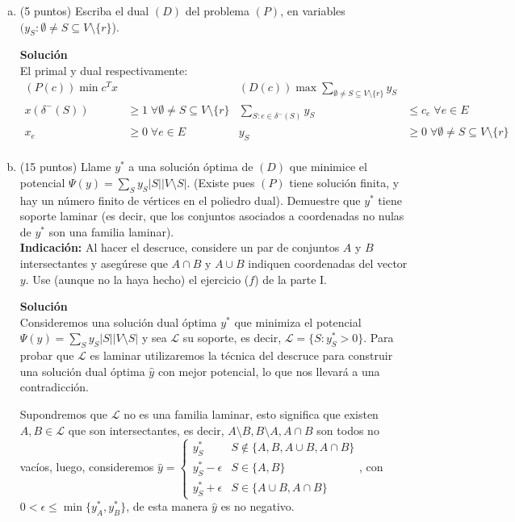 \documentclass{article}
\theoremstyle{plain}
\theoremstyle{definition}
\theoremstyle{Azul}
\begin{document}
\begin{enumerate}[(a)]
\item (5 puntos) Escriba el dual $(D)$ del problema $(P)$, en variables $(y_S\colon \emptyset \neq S \subseteq V\setminus \{r\}$).

\textbf{Solución}\\
El primal y dual respectivamente:
\begin{align*}
	(P(c)) \min c^{T}x && (D(c)) \max \sum_{\emptyset \neq S\subseteq V\setminus\{r\}}y_{S}\\
	x(\delta^{-}(S))&\geq 1 \;\forall \emptyset \neq S\subseteq V\setminus\{r\} &   \sum_{S: e\in\delta^{-}(S)}y_{S}&\leq c_{e} \; \forall e \in E\\
	x_{e}&\geq 0 \;\forall e \in E &  y_{S}&\geq 0 \;\forall \emptyset \neq S\subseteq V\setminus\{r\}\\
\end{align*}

\item (15 puntos) Llame $y^*$ a una solución óptima de $(D)$ que minimice el potencial $\Psi(y)=\sum_{S} y_S |S||V\setminus S|$. (Existe pues $(P)$ tiene solución finita, y hay un número finito de vértices en el poliedro dual). Demuestre que $y^*$ tiene soporte laminar (es decir, que los conjuntos asociados a coordenadas no nulas de $y^*$ son una familia laminar).\\
\textbf{Indicación:} Al hacer el descruce, considere un par de conjuntos $A$ y $B$ intersectantes y asegúrese que $A\cap B$ y $A\cup B$ indiquen coordenadas del vector $y$.
Use (aunque no la haya hecho) el ejercicio ($f$) de la parte I. 

\textbf{Solución}\\
Consideremos una solución dual óptima $y^{*}$ que minimiza el potencial $\Psi (y)=\sum_{S}y_{S}|S||V\setminus S|$ y sea $\mathcal{L}$ su soporte, es decir, $\mathcal{L}=\{S: y^{*}_{S}>0\}$. Para probar que $\mathcal{L}$ es  laminar utilizaremos la técnica del descruce para construir una solución dual óptima $\hat{y}$ con mejor potencial, lo que nos llevará a una contradicción.

Supondremos que $\mathcal{L}$ no es una familia laminar, esto significa que existen $A, B \in \mathcal{L}$ que son intersectantes, es decir, $A\setminus B, B\setminus A, A\cap B$ son todos no vacíos, luego, consideremos $\hat{y}=
\begin{cases} y^{*}_{S} &  S \notin \{A,B, A\cup B, A\cap B\}\\ y^{*}_{S}-\epsilon & S \in \{A,B\}\\ y^{*}_{S}+\epsilon & S \in \{A\cup B, A\cap B\}
\end{cases}$, con $0<\epsilon\leq \min\{y^{*}_{A}, y^{*}_{B}\}$, de esta manera $\hat{y}$ es no negativo.


\end{enumerate}
\end{document}
